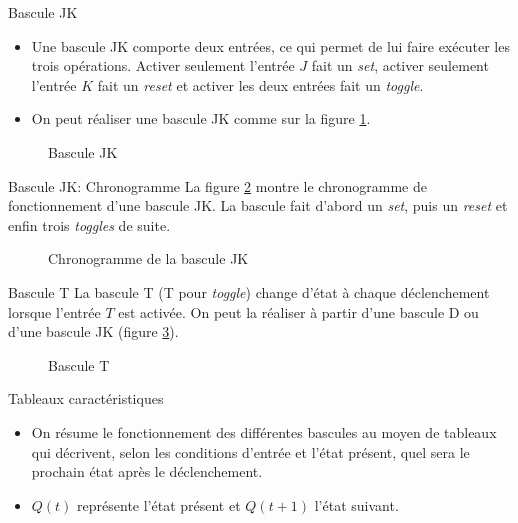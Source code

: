 \documentclass[presentation]{beamer}
\begin{document}
\begin{frame}[label={sec:org0657faf}]{Bascule JK}
\begin{itemize}
\item Une bascule JK comporte deux entrées, ce qui permet de lui faire exécuter les trois opérations. Activer seulement l'entrée \(J\) fait un \emph{set}, activer seulement l'entrée \(K\) fait un \emph{reset} et activer les deux entrées fait un \emph{toggle}.

\item On peut réaliser une bascule JK comme sur la figure \ref{fig:org14dcfe7}.
\end{itemize}

\begin{figure}[htbp]
\centering

\caption{\label{fig:org14dcfe7}Bascule JK}
\end{figure}
\end{frame}

\begin{frame}[label={sec:orgb00525f}]{Bascule JK: Chronogramme}
La figure \ref{fig:org811a5e8} montre le chronogramme de fonctionnement
d'une bascule JK. La bascule fait d'abord un \emph{set}, puis un \emph{reset} et
enfin trois \emph{toggles} de suite.

\begin{figure}[htbp]
\centering

\caption{\label{fig:org811a5e8}Chronogramme de la bascule JK}
\end{figure}
\end{frame}

\begin{frame}[label={sec:orgc1a4c7e}]{Bascule T}
La bascule T (T pour \emph{toggle}) change d'état à chaque déclenchement
lorsque l'entrée \(T\) est activée. On peut la réaliser à partir d'une
bascule D ou d'une bascule JK (figure \ref{fig:org815f537}).

\begin{figure}[htbp]
\centering

\caption{\label{fig:org815f537}Bascule T}
\end{figure}
\end{frame}

\begin{frame}[label={sec:org740e2d0}]{Tableaux caractéristiques}
\begin{itemize}
\item On résume le fonctionnement des différentes bascules au moyen de tableaux qui décrivent, selon les conditions d'entrée et l'état présent, quel sera le prochain état après le déclenchement.

\item \(Q(t)\) représente l'état présent et \(Q(t+1)\) l'état suivant.
\end{itemize}
\end{frame}
\end{document}
